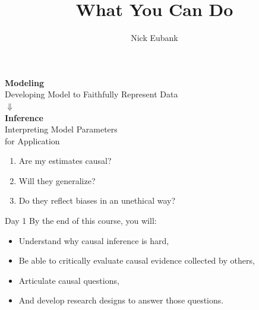 \documentclass[11pt]{beamer}
\title{What You Can Do}
\author{\small Nick Eubank}
\date{\vspace*{.3in} \date}
\begin{document}
\begin{frame}[c]
\maketitle
\end{frame}


\begin{frame}[c]
    \centering
    \textbf{Modeling} \\
    Developing Model to Faithfully Represent Data \\
    \vspace*{0.2cm}
    \pause $\Downarrow$ \\
    \vspace*{0.2cm}
     \textbf{Inference} \\
    Interpreting Model Parameters \\
    for Application \\
    \vspace{1cm}
    \begin{enumerate}
        \pause \item Are my estimates causal?
        \pause \item Will they generalize?
        \pause \item Do they reflect biases in an unethical way?
    \end{enumerate}
\end{frame}



\begin{frame}[c]{Day 1}
    \pause By the end of this course, you will:
        \begin{itemize}
            \item Understand why causal inference is hard, \\
            \item Be able to critically evaluate causal evidence collected by others, \\
            \item Articulate causal questions, \\
            \item And develop research designs to answer those questions. \\
        \end{itemize}
\end{frame}
    
\end{document}
